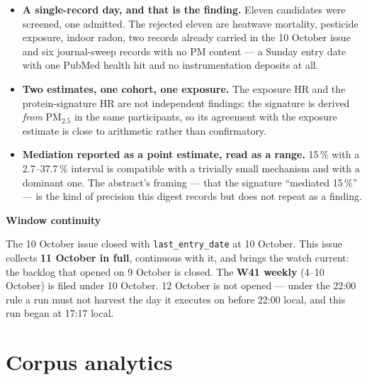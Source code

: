 \documentclass[10pt]{article}
\begin{document}
\footnotesize
\begin{itemize}

\item \textbf{A single-record day, and that is the finding.} Eleven candidates were screened, one admitted.
The rejected eleven are heatwave mortality, pesticide exposure, indoor radon, two records already carried
in the 10 October issue and six journal-sweep records with no PM content --- a Sunday entry date with one
PubMed health hit and no instrumentation deposits at all.

\item \textbf{Two estimates, one cohort, one exposure.} The exposure HR and the protein-signature HR are not
independent findings: the signature is derived \textit{from} PM$_{2.5}$ in the same participants, so its
agreement with the exposure estimate is close to arithmetic rather than confirmatory.

\item \textbf{Mediation reported as a point estimate, read as a range.} 15\,\% with a 2.7--37.7\,\%
interval is compatible with a trivially small mechanism and with a dominant one. The abstract's framing
--- that the signature ``mediated 15\,\%'' --- is the kind of precision this digest records but does not
repeat as a finding.

\end{itemize}

\vspace{2mm}

\begin{keybox}
{\sffamily\bfseries\footnotesize\color{Deep}Window continuity}\\[1.2mm]
{\fontsize{7.2}{8.8}\selectfont
The 10 October issue closed with \texttt{last\_entry\_date} at 10 October. This issue collects
\textbf{11 October in full}, continuous with it, and brings the watch current: the backlog that opened on
9 October is closed. The \textbf{W41 weekly} (4--10 October) is filed under 10 October. 12 October is not
opened --- under the 22:00 rule a run must not harvest the day it executes on before 22:00 local, and this
run began at 17:17 local.\par}
\end{keybox}

\vspace{3mm}
\par{}\baselineskip{}\baselineskip
\section*{\sffamily\bfseries\color{Deep}Corpus analytics}
\vspace{-1.5mm}{\color{Amber}\rule{\linewidth}{1.1pt}}\vspace{2.5mm}
\end{document}
